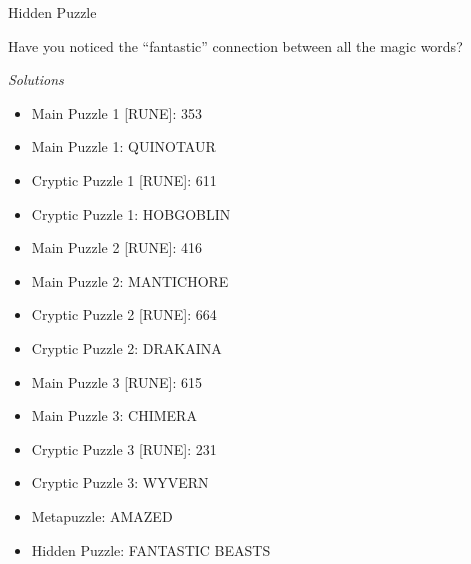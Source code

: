 \documentclass{article}
\newcommand{\clue}[1]{#1}
\newcommand{\puzzleTitle}[1]{
\begin{center}\LARGE\textit{#1}\end{center}
}
\begin{document}
\newpage

\clue{
Hidden Puzzle

Have you noticed the ``fantastic'' connection between all the magic words?
}

\newpage

\puzzleTitle{Solutions}

\begin{itemize}
\item Main Puzzle 1 [RUNE]: 353
\item Main Puzzle 1: QUINOTAUR
\item Cryptic Puzzle 1 [RUNE]: 611
\item Cryptic Puzzle 1: HOBGOBLIN
\item Main Puzzle 2 [RUNE]: 416
\item Main Puzzle 2: MANTICHORE
\item Cryptic Puzzle 2 [RUNE]: 664
\item Cryptic Puzzle 2: DRAKAINA
\item Main Puzzle 3 [RUNE]: 615
\item Main Puzzle 3: CHIMERA
\item Cryptic Puzzle 3 [RUNE]: 231
\item Cryptic Puzzle 3: WYVERN
\item Metapuzzle: AMAZED
\item Hidden Puzzle: FANTASTIC BEASTS
\end{itemize}
\end{document}
